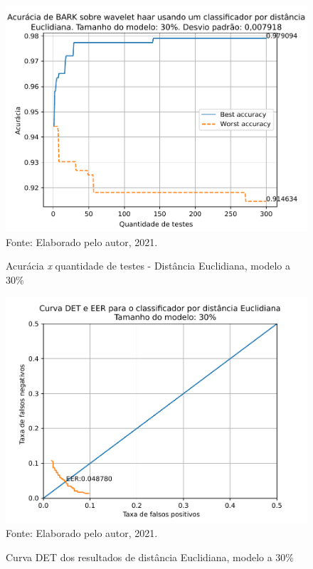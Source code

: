			\begin{figure}[H]
				\centering
				\caption{Acurácia \textit{x} quantidade de testes - Distância Euclidiana, modelo a 30\%}
				\includegraphics[width=.9\linewidth]{images/results/confusionMatrices/classifier_Euclidian_30}
				\label{fig:classifiereuclidian30}
				\\Fonte: Elaborado pelo autor, 2021.
			\end{figure}
		
			\begin{figure}[H]
				\centering
				\caption{Curva DET dos resultados de distância Euclidiana, modelo a 30\%}
				\includegraphics[width=.9\linewidth]{images/results/det/DET_for_classifier_Euclidian_30}
				\label{fig:detforclassifiereuclidian30}
				\\Fonte: Elaborado pelo autor, 2021.
			\end{figure}
			

